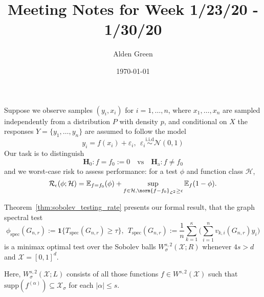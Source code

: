 \documentclass{article}
\newcommand{\abs}[1]{\left \lvert #1 \right \rvert}
\newcommand{\1}{\mathbf{1}}
\newcommand{\Xset}{\mathcal{X}}
\newcommand{\Leb}{\mathcal{L}}
\newcommand{\Ebb}{\mathbb{E}}
\newcommand{\spec}{\mathrm{spec}}
\theoremstyle{alden}
\theoremstyle{aldenthm}
\theoremstyle{definition}
\theoremstyle{remark}
\begin{document}
\title{Meeting Notes for Week 1/23/20 - 1/30/20}
\author{Alden Green}
\date{\today}
\maketitle

Suppose we observe samples $(y_i,x_i)$ for $i = 1,\ldots,n$, where $x_1,\ldots,x_n$ are sampled independently from a distribution $P$ with density $p$, and conditional on $X$ the responses $Y = \{y_1,\ldots,y_n\}$ are assumed to follow the model
\begin{equation}
\label{eqn:regression_random_design_known_variance}
y_i = f(x_i) + \varepsilon_i, ~~ \varepsilon_i \overset{\textrm{i.i.d}}{\sim} \mathcal{N}(0,1)
\end{equation} 
Our task is to distinguish
\begin{equation*}
\mathbf{H}_0: f = f_0 := 0 \quad \textrm{vs} \quad \mathbf{H}_{\textrm{a}}: f \neq f_0
\end{equation*}
and we worst-case risk to assess performance: for a test $\phi$ and function class $\mathcal{H}$,
\begin{equation*}
\mathcal{R}_{\epsilon}(\phi; \mathcal{H}) = \Ebb_{f = f_0}(\phi) + \sup_{f \in \mathcal{H}, \norm{f - f_0}_{\Leb^2} \geq \epsilon} \Ebb_f(1 - \phi).
\end{equation*}

Theorem~\ref{thm:sobolev_testing_rate} presents our formal result, that the graph spectral test 
\begin{equation*}
\phi_{\spec}(G_{n,r}) := \1\bigl\{T_{\textrm{spec}}(G_{n,r}) \geq \tau\bigr\},~~ T_{\textrm{spec}}(G_{n,r}) := \frac{1}{n}\sum_{k = 1}^{\kappa} \biggl(\sum_{i = 1}^{n} v_{k,i}(G_{n,r}) y_i\biggr)
\end{equation*} is a minimax optimal test over the Sobolev balls $W_{\sigma}^{s,2}(\mathcal{X};R)$ whenever $4s > d$ and $\Xset = [0,1]^d$. 

Here, $W_{\sigma}^{s,2}(\Xset;L)$ consists of all those functions $f \in W^{s,2}(\Xset)$ such that $\mathrm{supp}(f^{(\alpha)}) \subseteq \Xset_{\sigma}$ for each $\abs{\alpha} \leq s$.
\end{document}
